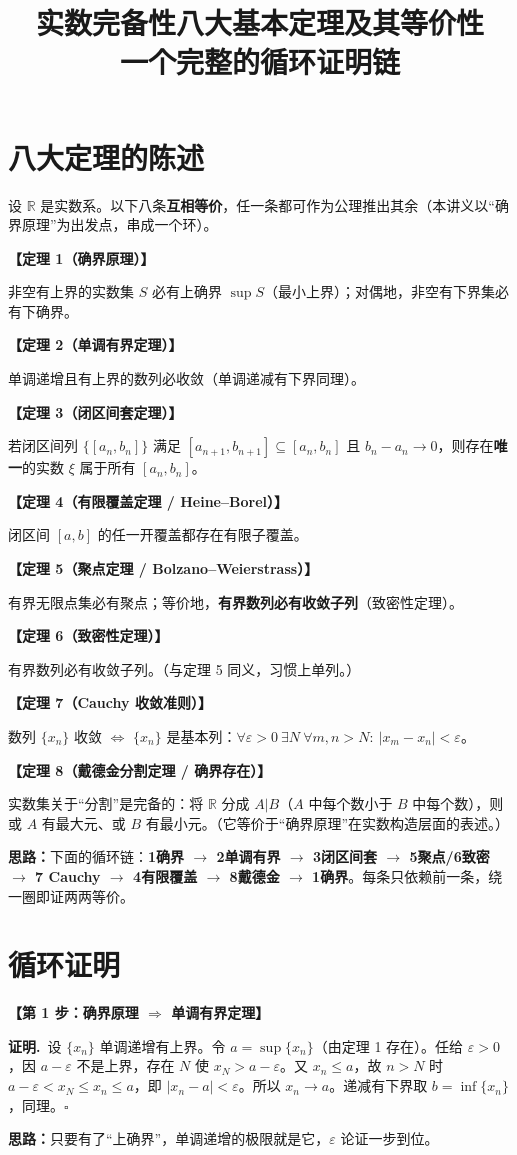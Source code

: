 \documentclass[11pt,a4paper,UTF8]{ctexart}
\title{实数完备性\quad 八大基本定理及其等价性\\[4pt]\large 一个完整的循环证明链}
\author{}
\date{}
\newcommand{\R}{\mathbb R}
\newcommand{\eps}{\varepsilon}
\newcommand{\st}[1]{\par\medskip\noindent\colorbox{blue!10}{\parbox{\dimexpr\linewidth-2\fboxsep}{\textbf{【#1】}}}\par\smallskip}
\newcommand{\pf}{\par\smallskip\noindent\textbf{证明.}\ }
\newcommand{\qed}{\hfill$\square$}
\newcommand{\idea}[1]{\par\smallskip\noindent\colorbox{yellow!20}{\parbox{\dimexpr\linewidth-2\fboxsep}{\textbf{思路：}#1}}\par\smallskip}
\begin{document}
\maketitle

\section{八大定理的陈述}

设 $\R$ 是实数系。以下八条\textbf{互相等价}，任一条都可作为公理推出其余（本讲义以“确界原理”为出发点，串成一个环）。

\st{定理 1（确界原理）}
非空有上界的实数集 $S$ 必有上确界 $\sup S$（最小上界）；对偶地，非空有下界集必有下确界。

\st{定理 2（单调有界定理）}
单调递增且有上界的数列必收敛（单调递减有下界同理）。

\st{定理 3（闭区间套定理）}
若闭区间列 $\{[a_n,b_n]\}$ 满足 $[a_{n+1},b_{n+1}]\subseteq[a_n,b_n]$ 且 $b_n-a_n\to0$，则存在\textbf{唯一}的实数 $\xi$ 属于所有 $[a_n,b_n]$。

\st{定理 4（有限覆盖定理 / Heine–Borel）}
闭区间 $[a,b]$ 的任一开覆盖都存在有限子覆盖。

\st{定理 5（聚点定理 / Bolzano–Weierstrass）}
有界无限点集必有聚点；等价地，\textbf{有界数列必有收敛子列}（致密性定理）。

\st{定理 6（致密性定理）}
有界数列必有收敛子列。（与定理 5 同义，习惯上单列。）

\st{定理 7（Cauchy 收敛准则）}
数列 $\{x_n\}$ 收敛 $\iff$ $\{x_n\}$ 是基本列：$\forall\eps>0\ \exists N\ \forall m,n>N:\ |x_m-x_n|<\eps$。

\st{定理 8（戴德金分割定理 / 确界存在）}
实数集关于“分割”是完备的：将 $\R$ 分成 $A|B$（$A$ 中每个数小于 $B$ 中每个数），则或 $A$ 有最大元、或 $B$ 有最小元。（它等价于“确界原理”在实数构造层面的表述。）

\idea{下面的循环链：\textbf{1确界 $\to$ 2单调有界 $\to$ 3闭区间套 $\to$ 5聚点/6致密 $\to$ 7 Cauchy $\to$ 4有限覆盖 $\to$ 8戴德金 $\to$ 1确界}。每条只依赖前一条，绕一圈即证两两等价。}

\section{循环证明}

\st{第 1 步：确界原理 $\Rightarrow$ 单调有界定理}
\pf 设 $\{x_n\}$ 单调递增有上界。令 $a=\sup\{x_n\}$（由定理 1 存在）。任给 $\eps>0$，因 $a-\eps$ 不是上界，存在 $N$ 使 $x_N>a-\eps$。又 $x_n\le a$，故 $n>N$ 时 $a-\eps<x_N\le x_n\le a$，即 $|x_n-a|<\eps$。所以 $x_n\to a$。递减有下界取 $b=\inf\{x_n\}$，同理。\qed
\idea{只要有了“上确界”，单调递增的极限就是它，$\eps$ 论证一步到位。}
\end{document}
